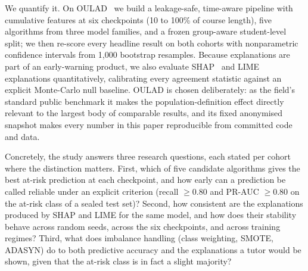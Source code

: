 \documentclass[conference]{IEEEtran}
\begin{document}
We quantify it. On OULAD~\cite{kuzilek2017} we build a leakage-safe,
time-aware pipeline with cumulative features at six checkpoints (10 to
100\% of course length), five algorithms from three model families, and a frozen
group-aware student-level split; we then re-score every headline result on
both cohorts with nonparametric confidence intervals from 1,000 bootstrap
resamples. Because explanations are part of an early-warning product, we
also evaluate SHAP~\cite{lundberg2017} and LIME~\cite{ribeiro2016}
explanations quantitatively, calibrating every agreement statistic against
an explicit Monte-Carlo null baseline. OULAD is chosen deliberately: as the
field's standard public benchmark it makes the population-definition effect
directly relevant to the largest body of comparable results, and its fixed
anonymised snapshot makes every number in this paper reproducible from
committed code and data.

Concretely, the study answers three research questions, each stated per
cohort where the distinction matters. First, which of five candidate
algorithms gives the best at-risk prediction at each checkpoint, and how
early can a prediction be called reliable under an explicit criterion
(recall $\geq 0.80$ and PR-AUC $\geq 0.80$ on the at-risk class of a
sealed test set)? Second, how consistent are the explanations produced by
SHAP and LIME for the same model, and how does their stability behave across
random seeds, across the six checkpoints, and across training regimes?
Third, what does imbalance handling (class weighting, SMOTE, ADASYN) do to
both predictive accuracy and the explanations a tutor would be shown, given
that the at-risk class is in fact a slight majority?
\end{document}
